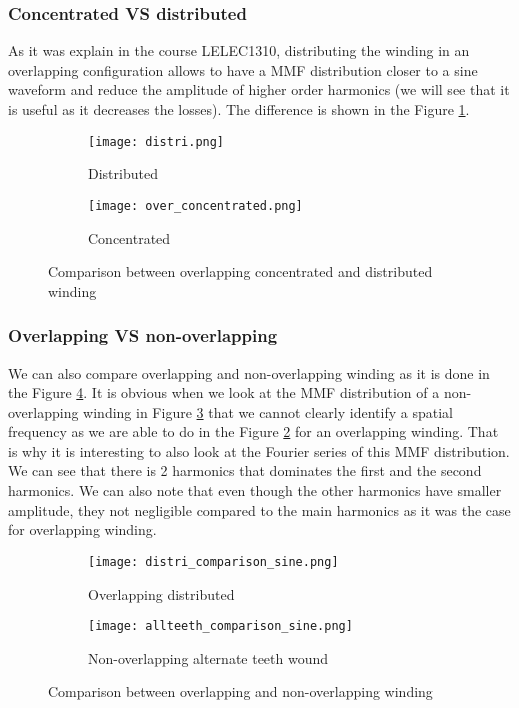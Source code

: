 \subsubsection{Concentrated VS distributed}
As it was explain in the course LELEC1310, distributing the winding in an overlapping configuration allows to have a MMF distribution closer to a sine waveform and reduce the amplitude of higher order harmonics (we will see that it is useful as it decreases the losses). The difference is shown in the Figure \ref{comp_conc_distri}.

\begin{figure}[H]
    \centering
    \begin{subfigure}{0.45 \textwidth}
     \centering 
     \texttt{[image: distri.png]}
     \caption{Distributed}
    \end{subfigure}
  \hspace{8pt}
    \begin{subfigure}{0.45\textwidth}
     \centering 
     \texttt{[image: over\_concentrated.png]}
     \caption{Concentrated}
    \end{subfigure}
    \caption{Comparison between overlapping concentrated and distributed winding}
    \label{comp_conc_distri}
\end{figure}

\subsubsection{Overlapping VS non-overlapping}
We can also compare overlapping and non-overlapping winding as it is done in the Figure \ref{comp_over_nonover}. It is obvious when we look at the MMF distribution of a non-overlapping winding in Figure \ref{comp_nonover} that we cannot clearly identify a spatial frequency as we are able to do in the Figure \ref{comp_over} for an overlapping winding. That is why it is interesting to also look at the Fourier series of this MMF distribution. We can see that there is 2 harmonics that dominates the first and the second harmonics. We can also note that even though the other harmonics have smaller amplitude, they not negligible compared to the main harmonics as it was the case for overlapping winding.

\begin{figure}[H]
    \centering
    \begin{subfigure}{0.45 \textwidth}
     \centering 
     \texttt{[image: distri\_comparison\_sine.png]}
     \caption{Overlapping distributed}
     \label{comp_over}
    \end{subfigure}
    \begin{subfigure}{0.45\textwidth}
     \centering 
     \texttt{[image: allteeth\_comparison\_sine.png]}
     \caption{Non-overlapping alternate teeth wound}
     \label{comp_nonover}
    \end{subfigure}
    \caption{Comparison between overlapping and non-overlapping winding}
    \label{comp_over_nonover}
\end{figure}

